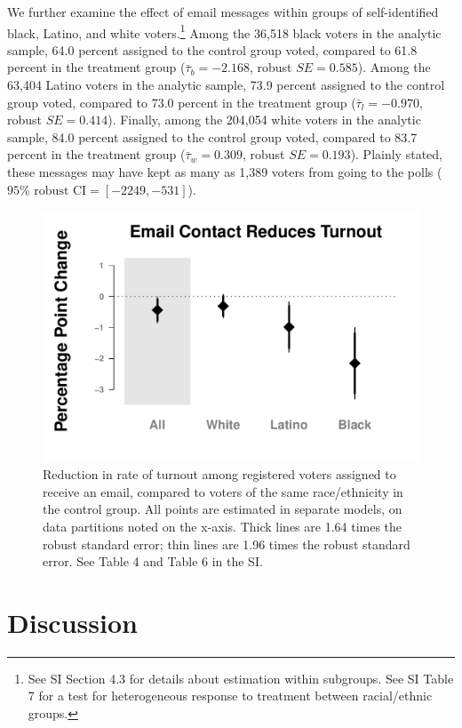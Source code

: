 \documentclass[12pt]{article}
\begin{document}
We further examine the effect of email messages within groups of
self-identified black, Latino, and white voters.\footnote{See SI
  Section 4.3 for details about estimation within subgroups.  See SI Table 7 for a test
  for heterogeneous response to treatment between racial/ethnic
  groups.}  Among the 36,518 black voters in the analytic sample, 64.0
percent assigned to the control group voted, compared to 61.8 percent
in the treatment group ($\bar{\tau}_{b} = -2.168$, robust
$SE = 0.585$). Among the 63,404 Latino voters in the analytic sample,
73.9 percent assigned to the control group voted, compared to 73.0
percent in the treatment group ($\bar{\tau}_{l} = -0.970$, robust
$SE = 0.414$).  Finally, among the 204,054 white voters in the
analytic sample, 84.0 percent assigned to the control group voted,
compared to 83.7 percent in the treatment group
($\bar{\tau}_{w} = 0.309$, robust $SE = 0.193$). Plainly stated, these
messages may have kept as many as 1,389 voters from going to the polls
($95\%\textrm{ robust CI} = [-2249, -531]$).

\begin{figure}[t]
  \centering
  \includegraphics[width=.75\textwidth]{../tables-figures/subgroup_effects}
  \caption[Subgroup Effect Plot]{Reduction in rate of turnout among
    registered voters assigned to receive an email, compared to voters
    of the same race/ethnicity in the control group. All points are
    estimated in separate models, on data partitions noted on the
    x-axis. Thick lines are 1.64 times the robust standard error; thin
    lines are 1.96 times the robust standard error. See Table 4 and
    Table 6 in the SI. \label{fig:subgroup}}
\end{figure}
  

\section{Discussion}
\end{document}
